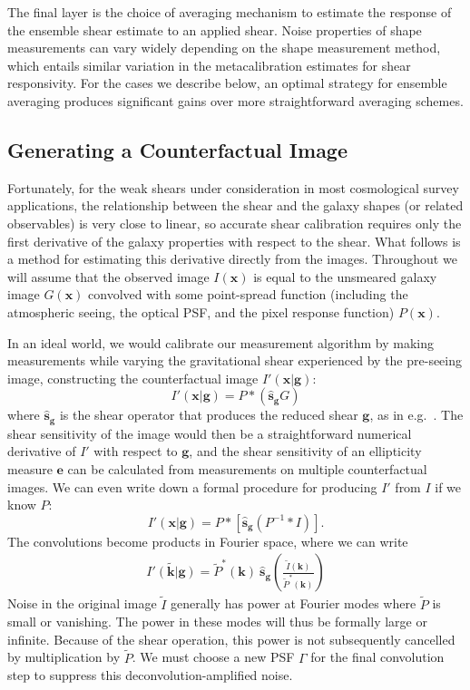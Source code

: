 \documentclass[iop]{emulateapj}
\begin{document}
The final layer is the choice of averaging mechanism to estimate the
response of the ensemble shear estimate to an applied shear. Noise
properties of shape measurements can vary widely depending on the
shape measurement method, which entails similar variation in the
metacalibration estimates for shear responsivity. For the cases we
describe below, an optimal strategy for ensemble averaging produces
significant gains over more straightforward averaging schemes.

\subsection{Generating a Counterfactual Image}
\label{sec:counterfactual}
Fortunately, for the weak shears under consideration in most
cosmological survey applications, the relationship between the shear
and the galaxy shapes (or related observables) is very close to
linear, so accurate shear calibration requires only the first
derivative of the galaxy properties with respect to the shear. What
follows is a method for estimating this derivative directly from the
images. Throughout we will assume that the observed image
$I({\mathbf{x}})$ is equal to the unsmeared galaxy image
$G(\mathbf{x})$ convolved with some point-spread function (including the
atmospheric seeing, the optical PSF, and the pixel response function) $P(\mathbf{x})$.

In an ideal world, we would calibrate our measurement algorithm by
making measurements while varying the gravitational shear experienced
by the pre-seeing image, constructing the counterfactual image
$I'(\mathbf{x}| {\boldsymbol g})$:
\begin{equation}
  I'({\mathbf{x}}|\mathbf{g}) = P \ast\left( \hat{\mathbf{s}}_{\mathbf{g}}G\right)
\end{equation}
where $\hat{\mathbf{s}}_{\boldsymbol g}$ is the shear operator that
produces the reduced shear $\mathbf{g}$, as in
e.g.~\cite{2002AJ....123..583B}. The shear sensitivity of the image
would then be a straightforward numerical derivative of $I'$ with
respect to $\mathbf{g}$, and the shear sensitivity of an ellipticity
measure $\mathbf{e}$ can be calculated from measurements on multiple
counterfactual images. We can even write down a formal procedure for
producing $I'$ from $I$ if we know $P$:
\begin{equation}
  I'({\mathbf{x}}|\mathbf{g}) = P \ast \left[\hat{\mathbf{s}}_\mathbf{g}\left( P^{-1} \ast I \right)\right].
\end{equation}
The convolutions become products in Fourier space, where we can write
\begin{align}
\tilde{I'({\mathbf{k}}|\mathbf{g})} = \tilde{P}^{\ast} (\mathbf{k}) \: \hat{\mathbf{s}}_\mathbf{g}\left(\frac{\tilde{I} (\mathbf{k})}{\tilde{P}^\ast (\mathbf{k})}\right)
\end{align}
Noise in the original image $\tilde{I}$ generally has power at Fourier
modes where $\tilde{P}$ is small or vanishing. The power in these
modes will thus be formally large or infinite. Because of the shear
operation, this power is not subsequently cancelled by multiplication
by $\tilde{P}$. We must choose a new PSF $\Gamma$ for the final
convolution step to suppress this deconvolution-amplified noise.
\end{document}
